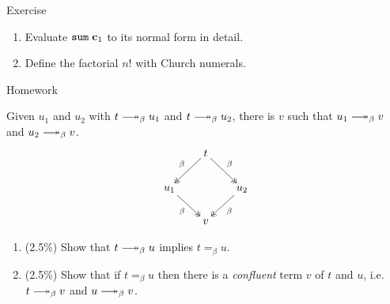 
\begin{frame}{Exercise}
  \begin{enumerate}
    \item Evaluate $\mathtt{sum}\;\mathbf{c}_1$ to its normal form in detail.
    \item Define the factorial $n!$ with Church numerals.
  \end{enumerate}
\end{frame}

\begin{frame}{Homework}
  \begin{theorem}
    Given $u_1$ and $u_2$ with $t \reduce u_1$ and $t\reduce u_2$, there is $v$
    such that $u_1 \reduce v$ and $u_2 \reduce v$. 
    \[
      \xymatrix@-4.8pt{
        & t \ar@{->>}[rd]^{\beta} \ar@{->>}[ld]_{\beta} \\
        u_1 \ar@{->>}[rd]_{\beta} & & u_2 \ar@{->>}[ld]^{\beta} \\
        & v
      }
    \]
  \end{theorem}
  \begin{enumerate}
    \item (2.5\%) Show that $t \reduce u$ implies $t =_\beta u$. 
    \item (2.5\%) Show that if $t =_\beta u$ then there is a \emph{confluent} term $v$ of $t$ and $u$, i.e.\ $t \reduce v$ and $u \reduce v$.
  \end{enumerate}
\end{frame}

